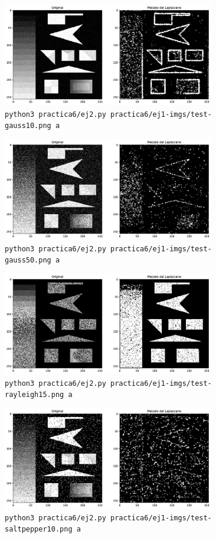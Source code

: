 \documentclass[11pt, spanish]{article}
\begin{document}
\begin{figure}[H]
\centering
    \includegraphics[height=4.5cm]{informe-imgs/ej2-a-test-gauss10.jpg}
    \caption{\texttt{python3 practica6/ej2.py practica6/ej1-imgs/test-gauss10.png a}}
\end{figure}

\begin{figure}[H]
\centering
    \includegraphics[height=4.5cm]{informe-imgs/ej2-a-test-gauss50.jpg}
    \caption{\texttt{python3 practica6/ej2.py practica6/ej1-imgs/test-gauss50.png a}}
\end{figure}

\begin{figure}[H]
\centering
    \includegraphics[height=4.5cm]{informe-imgs/ej2-a-test-rayleigh15.jpg}
    \caption{\texttt{python3 practica6/ej2.py practica6/ej1-imgs/test-rayleigh15.png a}}
\end{figure}

\begin{figure}[H]
\centering
    \includegraphics[height=4.5cm]{informe-imgs/ej2-a-test-saltpepper10.jpg}
    \caption{\texttt{python3 practica6/ej2.py practica6/ej1-imgs/test-saltpepper10.png a}}
\end{figure}
\end{document}
